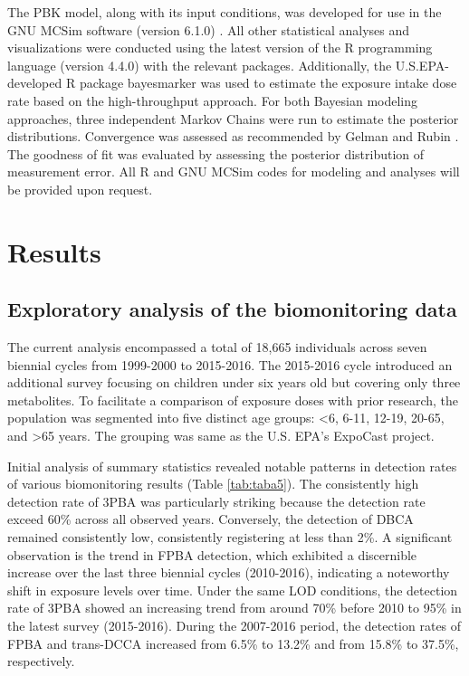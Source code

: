 \documentclass[toxics,article,submit,pdftex,moreauthors]{Definitions/mdpi}
\begin{document}
The PBK model, along with its input conditions, was developed for use in
the GNU MCSim software (version 6.1.0) \citep{bois_gnu_2009}. All other
statistical analyses and visualizations were conducted using the latest
version of the R programming language (version 4.4.0) with the relevant
packages. Additionally, the U.S.EPA-developed R package bayesmarker
\citep{stanfield2022bayesian} was used to estimate the exposure intake
dose rate based on the high-throughput approach. For both Bayesian
modeling approaches, three independent Markov Chains were run to
estimate the posterior distributions. Convergence was assessed as
recommended by Gelman and Rubin \citep{gelman1992inference}. The
goodness of fit was evaluated by assessing the posterior distribution of
measurement error. All R and GNU MCSim codes for modeling and analyses
will be provided upon request.

\section{Results}\label{results}

\subsection{Exploratory analysis of the biomonitoring
data}\label{exploratory-analysis-of-the-biomonitoring-data}

The current analysis encompassed a total of 18,665 individuals across
seven biennial cycles from 1999-2000 to 2015-2016. The 2015-2016 cycle
introduced an additional survey focusing on children under six years old
but covering only three metabolites. To facilitate a comparison of
exposure doses with prior research, the population was segmented into
five distinct age groups: \textless6, 6-11, 12-19, 20-65, and
\textgreater65 years. The grouping was same as the U.S. EPA's ExpoCast
project.

Initial analysis of summary statistics revealed notable patterns in
detection rates of various biomonitoring results (Table
\ref{tab:taba5}). The consistently high detection rate of 3PBA was
particularly striking because the detection rate exceed 60\% across all
observed years. Conversely, the detection of DBCA remained consistently
low, consistently registering at less than 2\%. A significant
observation is the trend in FPBA detection, which exhibited a
discernible increase over the last three biennial cycles (2010-2016),
indicating a noteworthy shift in exposure levels over time. Under the
same LOD conditions, the detection rate of 3PBA showed an increasing
trend from around 70\% before 2010 to 95\% in the latest survey
(2015-2016). During the 2007-2016 period, the detection rates of FPBA
and trans-DCCA increased from 6.5\% to 13.2\% and from 15.8\% to 37.5\%,
respectively.
\end{document}
